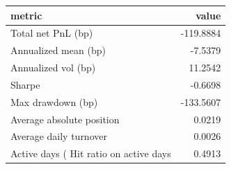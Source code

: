 \begin{tabular}{lr}
\toprule
metric & value \\
\midrule
Total net PnL (bp) & -119.8884 \\
Annualized mean (bp) & -7.5379 \\
Annualized vol (bp) & 11.2542 \\
Sharpe & -0.6698 \\
Max drawdown (bp) & -133.5607 \\
Average absolute position & 0.0219 \\
Average daily turnover & 0.0026 \\
Active days (%
Hit ratio on active days & 0.4913 \\
\bottomrule
\end{tabular}
